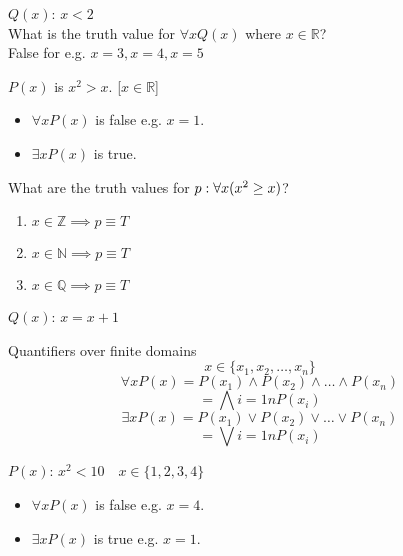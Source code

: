 \documentclass[a4paper, 12pt]{article}
\newenvironment{example}[1][Example]{\begin{trivlist}
\item[\hskip \labelsep {\bfseries #1}]}{\end{trivlist}}
\begin{document}
    \begin{example}
        $Q(x)$: $x < 2$\\
        What is the truth value for $\forall x Q(x)$ where $x \in \mathbb{R}$?\\
        False for e.g. $x = 3, x = 4, x = 5$
    \end{example}
    \begin{example}
        $P(x)$ is $x^2 > x$. [$x \in \mathbb{R}$]
        \begin{itemize}
            \item $\forall x P(x)$ is false e.g. $x = 1$.
            \item $\exists x P(x)$ is true.
        \end{itemize}
    \end{example}
    \begin{example}
        What are the truth values for $p: \space \forall x (x^2 \ge x)$?
        \begin{enumerate}
            \item $x \in \mathbb{Z} \implies p \equiv T$
            \item $x \in \mathbb{N} \implies p \equiv T$
            \item $x \in \mathbb{Q} \implies p \equiv T$
        \end{enumerate}
    \end{example}
    \begin{example}
        $Q(x)$: $x = x + 1$
    \end{example}
    Quantifiers over finite domains
    \[x \in \{x_1, x_2, \dots, x_n\}\]
    \[\forall x P(x) = P(x_1) \wedge P(x_2) \wedge \dots \wedge P(x_n)\]
    \[= \bigwedge{i = 1}{n} P(x_i)\]
    \[\exists x P(x) = P(x_1) \vee P(x_2) \vee \dots \vee P(x_n)\]
    \[= \bigvee{i = 1}{n} P(x_i)\]
    \begin{example}
        $P(x)$: $x^2 < 10 \quad x \in \{1, 2, 3, 4\}$
        \begin{itemize}
            \item $\forall x P(x)$ is false e.g. $x = 4$.
            \item $\exists x P(x)$ is true e.g. $x = 1$.
        \end{itemize}
    \end{example}
\end{document}
